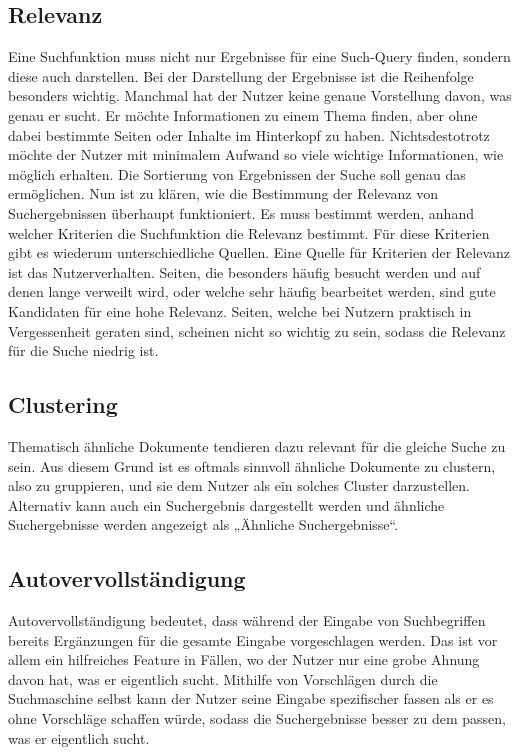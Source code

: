 \subsection*{Relevanz}
Eine Suchfunktion muss nicht nur Ergebnisse für eine Such-Query finden, sondern diese auch darstellen.
Bei der Darstellung der Ergebnisse ist die Reihenfolge besonders wichtig.
Manchmal hat der Nutzer keine genaue Vorstellung davon, was genau er sucht.
Er möchte Informationen zu einem Thema finden, aber ohne dabei bestimmte Seiten oder Inhalte im Hinterkopf zu haben.
Nichtsdestotrotz möchte der Nutzer mit minimalem Aufwand so viele wichtige Informationen, wie möglich erhalten.
Die Sortierung von Ergebnissen der Suche soll genau das ermöglichen.
Nun ist zu klären, wie die Bestimmung der Relevanz von Suchergebnissen überhaupt funktioniert.
Es muss bestimmt werden, anhand welcher Kriterien die Suchfunktion die Relevanz bestimmt.
Für diese Kriterien gibt es wiederum unterschiedliche Quellen.
Eine Quelle für Kriterien der Relevanz ist das Nutzerverhalten.
Seiten, die besonders häufig besucht werden und auf denen lange verweilt wird, oder welche sehr häufig bearbeitet werden, sind gute Kandidaten für eine hohe Relevanz.
Seiten, welche bei Nutzern praktisch in Vergessenheit geraten sind, scheinen nicht so wichtig zu sein, sodass die Relevanz für die Suche niedrig ist.
  

\subsection*{Clustering}
Thematisch ähnliche Dokumente tendieren dazu relevant für die gleiche Suche zu sein.
Aus diesem Grund ist es oftmals sinnvoll ähnliche Dokumente zu clustern, also zu gruppieren, und sie dem Nutzer als ein solches Cluster darzustellen.
Alternativ kann auch ein Suchergebnis dargestellt werden und ähnliche Suchergebnisse werden angezeigt als „Ähnliche Suchergebnisse“.

\subsection*{Autovervollständigung}
Autovervollständigung bedeutet, dass während der Eingabe von Suchbegriffen bereits Ergänzungen für die gesamte Eingabe vorgeschlagen werden.
Das ist vor allem ein hilfreiches Feature in Fällen, wo der Nutzer nur eine grobe Ahnung davon hat, was er eigentlich sucht.
Mithilfe von Vorschlägen durch die Suchmaschine selbst kann der Nutzer seine Eingabe spezifischer fassen als er es ohne Vorschläge schaffen würde, sodass die Suchergebnisse besser zu dem passen, was er eigentlich sucht.

